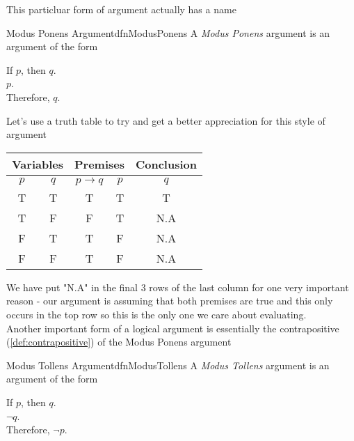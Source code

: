 This particluar form of argument actually has a name

\begin{dfn}[label={def:modusPonens}]{Modus Ponens Argument}{dfnModusPonens}
    A \emph{Modus Ponens} argument is an argument of the form
    \begin{center}
        If $p$, then $q$.\\
        $p$.\\
        Therefore, $q$.
    \end{center}
\end{dfn}

Let's use a truth table to try and get a better appreciation for this style of argument

\begin{center}
    \begin{tabular}{|c|c|c|c|c|}
        \hline
        \multicolumn{2}{|c|}{Variables} & \multicolumn{2}{|c|}{Premises} & Conclusion             \\
        \hline
        $p$                             & $q$                            & $p \to q$  & $p$ & $q$ \\
        \hline
        T                               & T                              & T          & T   & T   \\
        \hline
        T                               & F                              & F          & T   & N.A \\
        \hline
        F                               & T                              & T          & F   & N.A \\
        \hline
        F                               & F                              & T          & F   & N.A \\
        \hline
    \end{tabular}
\end{center}

We have put "N.A" in the final 3 rows of the last column for one very important reason - our argument is assuming that both premises are true and this only occurs in the top row so this is the only one we care about evaluating.\\

Another important form of a logical argument is essentially the contrapositive (\cref{def:contrapositive}) of the Modus Ponens argument

\begin{dfn}[label={def:modusTollens}]{Modus Tollens Argument}{dfnModusTollens}
    A \emph{Modus Tollens} argument is an argument of the form
    \begin{center}
        If $p$, then $q$.\\
        $\lnot q$.\\
        Therefore, $\lnot p$.
    \end{center}
\end{dfn}

